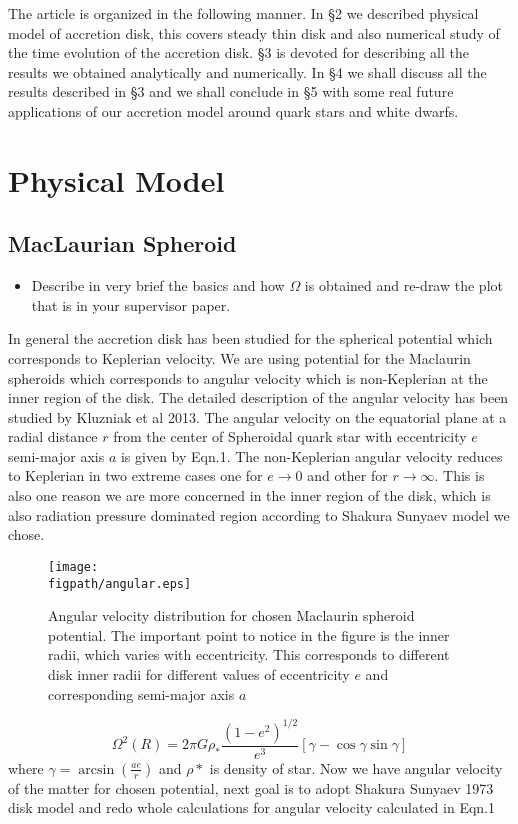 \documentclass[useAMS,usenatbib]{mn2e}
\newcommand{\figpath}{./Figs/}
\begin{document}
The article is organized in the following manner. In \S 2 we described physical model of accretion disk, this covers steady thin disk and also numerical study of the time evolution of the accretion disk. \S3 is devoted for describing all the results we obtained analytically and numerically. In \S4 we shall discuss all the results described in \S3 and we shall conclude in \S5 with some real future applications of our accretion model around quark stars and white dwarfs.  
\section{Physical Model}
\subsection{MacLaurian Spheroid}
\begin{itemize}
\item Describe in very brief the basics and how $\Omega$ is obtained
  and re-draw the plot that is in your supervisor paper. 
\end{itemize}
In general the accretion disk has been studied for the spherical potential which corresponds to Keplerian velocity. We are using potential for the Maclaurin spheroids which corresponds to angular velocity which is non-Keplerian at the inner region of the disk. The detailed description of the angular velocity has been studied by Kluzniak et al 2013. The angular velocity on the equatorial plane at a radial distance $r$ from the center of Spheroidal quark star with eccentricity $e$ semi-major axis $a$ is given by Eqn.1. The non-Keplerian angular velocity reduces to Keplerian in two extreme cases one for $e\rightarrow 0$ and other for $r\rightarrow \infty$. This is also one reason we are more concerned in the inner region of the disk, which is also radiation pressure dominated region according to Shakura Sunyaev model we chose.
\begin{figure}
\centering
\texttt{[image: \\figpath/angular.eps]}
\caption{Angular velocity distribution for chosen Maclaurin spheroid potential. The important point to notice in the figure is the inner radii, which varies with eccentricity. This corresponds to different disk inner radii for different values of eccentricity $e$ and corresponding semi-major axis $a$}
\label{fig:steadyplt1}
\end{figure}
\begin{equation}
\Omega ^2 \left(R\right)= 2\pi G\rho_* \frac{(1-e^2)^{1/2}}{e^3}\left[\gamma - \cos \gamma \sin\gamma \right]
\end{equation}  
where $\gamma = \arcsin (\frac{a e}{r})$ and $\rho *$ is density of star. Now we have angular velocity of the matter for chosen potential, next goal is to adopt Shakura Sunyaev 1973 disk model and redo whole calculations for angular velocity calculated in Eqn.1
\end{document}
